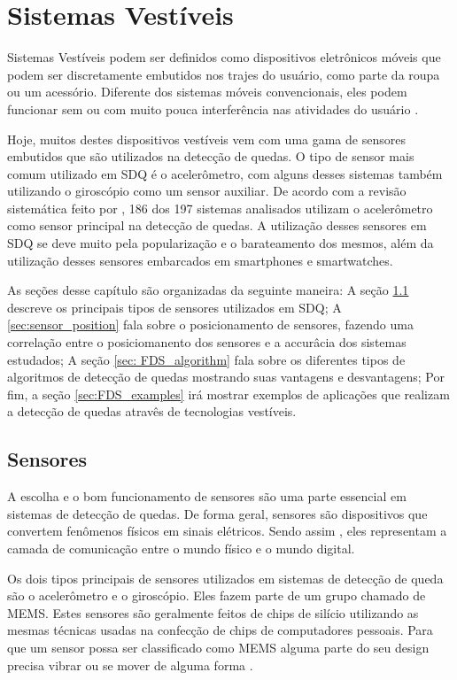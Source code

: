 \chapter{Sistemas Vestíveis} 
\label{cap:wearable_systems}

Sistemas Vestíveis podem ser definidos como dispositivos eletrônicos móveis que podem ser discretamente embutidos nos trajes do usuário, como parte da roupa ou um acessório. Diferente dos sistemas móveis convencionais, eles podem funcionar sem ou com muito pouca interferência nas atividades do usuário \citep{lukowicz2004wearable}. 

Hoje, muitos destes dispositivos vestíveis vem com uma gama de sensores embutidos que são utilizados na detecção de quedas. O tipo de sensor mais comum utilizado em \ac{SDQ} é o acelerômetro, com alguns desses sistemas também utilizando o giroscópio como um sensor auxiliar. De acordo com a revisão sistemática feito por \cite{igual2013challenges}, 186 dos 197 sistemas analisados utilizam o acelerômetro como sensor principal na detecção de quedas. A utilização desses sensores em \ac{SDQ} se deve muito pela popularização e o barateamento dos mesmos, além da utilização desses sensores embarcados em smartphones e smartwatches.


As seções desse capítulo são organizadas da seguinte maneira: A seção \ref{sec:sensors} descreve os principais tipos de sensores utilizados em \ac{SDQ}; A \ref{sec:sensor_position} fala sobre o posicionamento de sensores, fazendo uma correlação entre o posiciomanento dos sensores e a accurâcia dos sistemas estudados; A seção \ref{sec: FDS_algorithm} fala sobre os diferentes tipos de algoritmos de detecção de quedas mostrando suas vantagens e desvantagens; Por fim, a seção \ref{sec:FDS_examples} irá mostrar exemplos de aplicações que realizam a detecção de quedas atravês de tecnologias vestíveis. 



\section{Sensores}
\label{sec:sensors}
A escolha e o bom funcionamento de sensores são uma parte essencial em sistemas de detecção de quedas. De forma geral, sensores são dispositivos que convertem fenômenos físicos em sinais elétricos. Sendo assim , eles representam a camada de comunicação entre o mundo físico e o mundo digital. 

Os dois tipos principais de sensores utilizados em sistemas de detecção de queda são o acelerômetro e o giroscópio. Eles fazem parte de um grupo chamado de \ac{MEMS}. Estes sensores são geralmente feitos de chips de silício utilizando as mesmas técnicas usadas na confecção de chips de computadores pessoais. Para que um sensor possa ser classificado como \ac{MEMS} alguma parte do seu design precisa vibrar ou se mover de alguma forma \citep{milette2012professional}. 

